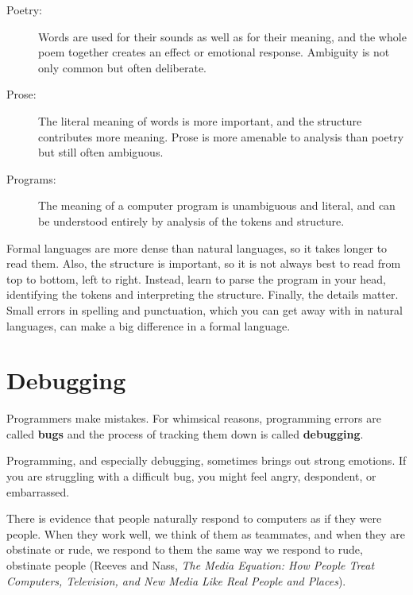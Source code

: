 \documentclass[10pt]{book}
\begin{document}
\begin{description}

\item[Poetry:] Words are used for their sounds as well as for
their meaning, and the whole poem together creates an effect or
emotional response.  Ambiguity is not only common but often
deliberate.

\item[Prose:] The literal meaning of words is more important,
and the structure contributes more meaning.  Prose is more amenable to
analysis than poetry but still often ambiguous.

\item[Programs:] The meaning of a computer program is unambiguous
and literal, and can be understood entirely by analysis of the
tokens and structure.

\end{description}

Formal languages are more dense
than natural languages, so it takes longer to read them.  Also, the
structure is important, so it is not always best to read
from top to bottom, left to right.  Instead, learn to parse the
program in your head, identifying the tokens and interpreting the
structure.  Finally, the details matter.  Small errors in
spelling and punctuation, which you can get away
with in natural languages, can make a big difference in a formal
language.


\section{Debugging}

Programmers make mistakes.  For whimsical reasons, programming errors
are called {\bf bugs} and the process of tracking them down is called
{\bf debugging}.

Programming, and especially debugging, sometimes brings out strong
emotions.  If you are struggling with a difficult bug, you might
feel angry, despondent, or embarrassed.

There is evidence that people naturally respond to computers as if
they were people.  When they work well, we think
of them as teammates, and when they are obstinate or rude, we
respond to them the same way we respond to rude,
obstinate people (Reeves and Nass, {\it The Media
    Equation: How People Treat Computers, Television, and New Media
    Like Real People and Places}).
\end{document}
